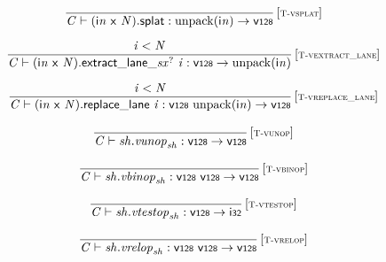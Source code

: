 $$
\begin{array}{@{}c@{}}\displaystyle
\frac{
}{
{\mathit{C}} \vdash ({\mathsf{i}}{{\mathit{n}}}~\mathsf{x}~{\mathit{N}}).\mathsf{splat} : {\mathrm{unpack}}({\mathsf{i}}{{\mathit{n}}}) \rightarrow \mathsf{v{\scriptstyle128}}
} \, {[\textsc{\scriptsize T{-}vsplat}]}
\qquad
\end{array}
$$

$$
\begin{array}{@{}c@{}}\displaystyle
\frac{
{\mathit{i}} < {\mathit{N}}
}{
{\mathit{C}} \vdash {({\mathsf{i}}{{\mathit{n}}}~\mathsf{x}~{\mathit{N}}).\mathsf{extract\_lane\_}}{{{\mathit{sx}}^?}}~{\mathit{i}} : \mathsf{v{\scriptstyle128}} \rightarrow {\mathrm{unpack}}({\mathsf{i}}{{\mathit{n}}})
} \, {[\textsc{\scriptsize T{-}vextract\_lane}]}
\qquad
\end{array}
$$

$$
\begin{array}{@{}c@{}}\displaystyle
\frac{
{\mathit{i}} < {\mathit{N}}
}{
{\mathit{C}} \vdash ({\mathsf{i}}{{\mathit{n}}}~\mathsf{x}~{\mathit{N}}).\mathsf{replace\_lane}~{\mathit{i}} : \mathsf{v{\scriptstyle128}}~{\mathrm{unpack}}({\mathsf{i}}{{\mathit{n}}}) \rightarrow \mathsf{v{\scriptstyle128}}
} \, {[\textsc{\scriptsize T{-}vreplace\_lane}]}
\qquad
\end{array}
$$

$$
\begin{array}{@{}c@{}}\displaystyle
\frac{
}{
{\mathit{C}} \vdash {\mathit{sh}} . {\mathit{vunop}}_{{\mathit{sh}}} : \mathsf{v{\scriptstyle128}} \rightarrow \mathsf{v{\scriptstyle128}}
} \, {[\textsc{\scriptsize T{-}vunop}]}
\qquad
\end{array}
$$

$$
\begin{array}{@{}c@{}}\displaystyle
\frac{
}{
{\mathit{C}} \vdash {\mathit{sh}} . {\mathit{vbinop}}_{{\mathit{sh}}} : \mathsf{v{\scriptstyle128}}~\mathsf{v{\scriptstyle128}} \rightarrow \mathsf{v{\scriptstyle128}}
} \, {[\textsc{\scriptsize T{-}vbinop}]}
\qquad
\end{array}
$$

$$
\begin{array}{@{}c@{}}\displaystyle
\frac{
}{
{\mathit{C}} \vdash {\mathit{sh}} . {\mathit{vtestop}}_{{\mathit{sh}}} : \mathsf{v{\scriptstyle128}} \rightarrow \mathsf{i{\scriptstyle32}}
} \, {[\textsc{\scriptsize T{-}vtestop}]}
\qquad
\end{array}
$$

$$
\begin{array}{@{}c@{}}\displaystyle
\frac{
}{
{\mathit{C}} \vdash {\mathit{sh}} . {\mathit{vrelop}}_{{\mathit{sh}}} : \mathsf{v{\scriptstyle128}}~\mathsf{v{\scriptstyle128}} \rightarrow \mathsf{v{\scriptstyle128}}
} \, {[\textsc{\scriptsize T{-}vrelop}]}
\qquad
\end{array}
$$

